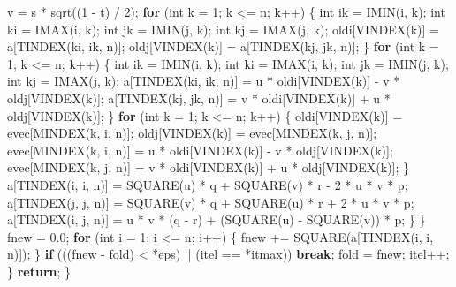 \documentclass[
  12pt,
]{book}
\newenvironment{Shaded}{\begin{snugshade}}{\end{snugshade}}
\newcommand{\ControlFlowTok}[1]{\textcolor[rgb]{0.13,0.29,0.53}{\textbf{#1}}}
\newcommand{\DataTypeTok}[1]{\textcolor[rgb]{0.13,0.29,0.53}{#1}}
\newcommand{\DecValTok}[1]{\textcolor[rgb]{0.00,0.00,0.81}{#1}}
\newcommand{\FloatTok}[1]{\textcolor[rgb]{0.00,0.00,0.81}{#1}}
\newcommand{\NormalTok}[1]{#1}
\theoremstyle{definition}
\theoremstyle{definition}
\theoremstyle{definition}
\theoremstyle{definition}
\theoremstyle{remark}
\begin{document}
\begin{Shaded}
\begin{Highlighting}[]
\NormalTok{                v = s * sqrt((}\DecValTok{1}\NormalTok{ {-} t) / }\DecValTok{2}\NormalTok{);}
                \ControlFlowTok{for}\NormalTok{ (}\DataTypeTok{int}\NormalTok{ k = }\DecValTok{1}\NormalTok{; k \textless{}= n; k++) \{}
                    \DataTypeTok{int}\NormalTok{ ik = IMIN(i, k);}
                    \DataTypeTok{int}\NormalTok{ ki = IMAX(i, k);}
                    \DataTypeTok{int}\NormalTok{ jk = IMIN(j, k);}
                    \DataTypeTok{int}\NormalTok{ kj = IMAX(j, k);}
\NormalTok{                    oldi[VINDEX(k)] = a[TINDEX(ki, ik, n)];}
\NormalTok{                    oldj[VINDEX(k)] = a[TINDEX(kj, jk, n)];}
\NormalTok{                \}}
                \ControlFlowTok{for}\NormalTok{ (}\DataTypeTok{int}\NormalTok{ k = }\DecValTok{1}\NormalTok{; k \textless{}= n; k++) \{}
                    \DataTypeTok{int}\NormalTok{ ik = IMIN(i, k);}
                    \DataTypeTok{int}\NormalTok{ ki = IMAX(i, k);}
                    \DataTypeTok{int}\NormalTok{ jk = IMIN(j, k);}
                    \DataTypeTok{int}\NormalTok{ kj = IMAX(j, k);}
\NormalTok{                    a[TINDEX(ki, ik, n)] =}
\NormalTok{                        u * oldi[VINDEX(k)] {-} v * oldj[VINDEX(k)];}
\NormalTok{                    a[TINDEX(kj, jk, n)] =}
\NormalTok{                        v * oldi[VINDEX(k)] + u * oldj[VINDEX(k)];}
\NormalTok{                \}}
                \ControlFlowTok{for}\NormalTok{ (}\DataTypeTok{int}\NormalTok{ k = }\DecValTok{1}\NormalTok{; k \textless{}= n; k++) \{}
\NormalTok{                    oldi[VINDEX(k)] = evec[MINDEX(k, i, n)];}
\NormalTok{                    oldj[VINDEX(k)] = evec[MINDEX(k, j, n)];}
\NormalTok{                    evec[MINDEX(k, i, n)] =}
\NormalTok{                        u * oldi[VINDEX(k)] {-} v * oldj[VINDEX(k)];}
\NormalTok{                    evec[MINDEX(k, j, n)] =}
\NormalTok{                        v * oldi[VINDEX(k)] + u * oldj[VINDEX(k)];}
\NormalTok{                \}}
\NormalTok{                a[TINDEX(i, i, n)] =}
\NormalTok{                    SQUARE(u) * q + SQUARE(v) * r {-} }\DecValTok{2}\NormalTok{ * u * v * p;}
\NormalTok{                a[TINDEX(j, j, n)] =}
\NormalTok{                    SQUARE(v) * q + SQUARE(u) * r + }\DecValTok{2}\NormalTok{ * u * v * p;}
\NormalTok{                a[TINDEX(i, j, n)] =}
\NormalTok{                    u * v * (q {-} r) + (SQUARE(u) {-} SQUARE(v)) * p;}
\NormalTok{            \}}
\NormalTok{        \}}
\NormalTok{        fnew = }\FloatTok{0.0}\NormalTok{;}
        \ControlFlowTok{for}\NormalTok{ (}\DataTypeTok{int}\NormalTok{ i = }\DecValTok{1}\NormalTok{; i \textless{}= n; i++) \{}
\NormalTok{            fnew += SQUARE(a[TINDEX(i, i, n)]);}
\NormalTok{        \}}
        \ControlFlowTok{if}\NormalTok{ (((fnew {-} fold) \textless{} *eps) || (itel == *itmax)) }\ControlFlowTok{break}\NormalTok{;}
\NormalTok{        fold = fnew;}
\NormalTok{        itel++;}
\NormalTok{    \}}
    \ControlFlowTok{return}\NormalTok{;}
\NormalTok{\}}


\end{Highlighting}
\end{Shaded}
\end{document}
